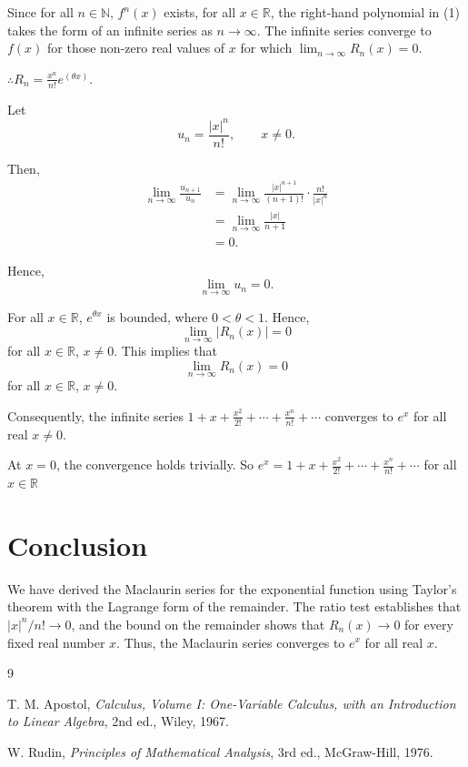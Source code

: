 \documentclass[12pt,a4paper]{article}
\begin{document}
Since for all \(n \in \mathbb{N}\), \(f^{n}(x)\) exists, for all
\(x \in \mathbb{R}\), the right-hand polynomial in (1) takes the form of
an infinite series as \(n \to \infty\).
The infinite series converge to \(f(x)\) for those non-zero real
values of \(x\) for which $\displaystyle\lim_{n \to \infty} R_n(x) = 0.$

$ \therefore R_n = \frac{x^n}{n!}e^{\left(\theta x\right)}. $


Let
\[
u_n = \frac{|x|^n}{n!}, \qquad x \neq 0.
\]

Then,
\begin{align*}
\lim_{n \to \infty} \frac{u_{n+1}}{u_n}
&= \lim_{n \to \infty}
\frac{|x|^{n+1}}{(n+1)!}
\cdot \frac{n!}{|x|^n} \\[6pt]
&= \lim_{n \to \infty} \frac{|x|}{n+1} \\[6pt]
&= 0.
\end{align*}

Hence,
\[
\lim_{n \to \infty} u_n = 0.
\]

For all \(x \in \mathbb{R}\), \(e^{\theta x}\) is bounded, where \(0 < \theta < 1\). Hence,
\[
\lim_{n \to \infty} |R_n(x)| = 0
\]
for all \(x \in \mathbb{R}\), \(x \neq 0\). This implies that
\[
\lim_{n \to \infty} R_n(x) = 0
\]
for all \(x \in \mathbb{R}\), \(x \neq 0\).

Consequently, the infinite series $1 + x + \frac{x^2}{2!} + \cdots + \frac{x^n}{n!} + \cdots $ converges to \(e^x\) for all real \(x \neq 0\).

At \(x = 0\), the convergence holds trivially.
So $ e^x = 1 + x + \frac{x^2}{2!} + \cdots + \frac{x^n}{n!} + \cdots $ for all $x \in \mathbb{R}$

\section{Conclusion}

We have derived the Maclaurin series for the exponential function
using Taylor's theorem with the Lagrange form of the remainder.
The ratio test establishes that $|x|^n/n!\to 0$, and the bound on
the remainder shows that $R_n(x)\to 0$ for every fixed real
number $x$. Thus, the Maclaurin series converges to $e^x$ for all
real $x$.

\begin{thebibliography}{9}

T. M. Apostol,
\emph{Calculus, Volume I: One-Variable Calculus, with an
Introduction to Linear Algebra},
2nd ed., Wiley, 1967.

W. Rudin,
\emph{Principles of Mathematical Analysis},
3rd ed., McGraw-Hill, 1976.

\end{thebibliography}
\end{document}
